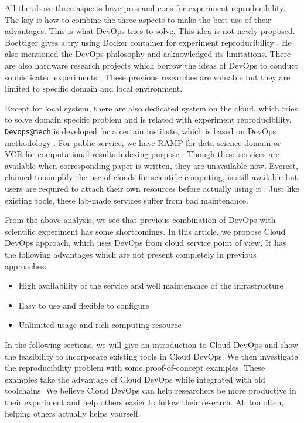 \documentclass[10pt, conference, compsocconf]{IEEEtran}
\begin{document}
All the above three aspects have pros and cons for experiment reproducibility. The key is how to combine the three aspects to make the best use of their advantages. This is what DevOps tries to solve. This idea is not newly proposed. Boettiger gives a try using Docker container for experiment reproducibility \cite{Boettiger15}.
He also mentioned the DevOps philosophy and acknowledged its limitations.
There are also hardware research projects which borrow the ideas of DevOps to conduct sophisticated experiments \cite{chwalisz2019walker}. These previous researches are valuable but they are limited to specific domain and local environment.

Except for local system, there are also dedicated system on the cloud, which tries to solve domain specific problem and is related with experiment reproducibility. \texttt{Devops@mech} is developed for a certain institute, which is based on DevOps methodology \cite{philips2019devops}. For public service, we have RAMP for data science domain \cite{kegl2018ramp} or VCR for computational results indexing purpose \cite{GavishD12}. Though these services are available when corresponding paper is written, they are unavailable now.
Everest, claimed to simplify the use of clouds for scientific computing, is still available but users are required to attach their own resources before actually using it \cite{VOLKOV2017112}.
Just like existing tools, these lab-made services suffer from bad maintenance.

From the above analysis, we see that previous combination of DevOps with scientific experiment has some shortcomings. In this article, we propose Cloud DevOps approach, which uses DevOps from cloud service point of view. It has the following advantages which are not present completely in previous approaches:
\begin{itemize}
	\item High availability of the service and well maintenance of the infrastructure
	\item Easy to use and flexible to configure
	\item Unlimited usage and rich computing resource
\end{itemize}
 In the following sections, we will give an introduction to Cloud DevOps and show the feasibility to incorporate existing tools in Cloud DevOps. We then investigate the reproducibility problem with some proof-of-concept examples. These examples take the advantage of Cloud DevOps while integrated with old toolchains. We believe Cloud DevOps can help researchers be more productive in their experiment and help others easier to follow their research. All too often, helping others actually helps yourself.
\end{document}
